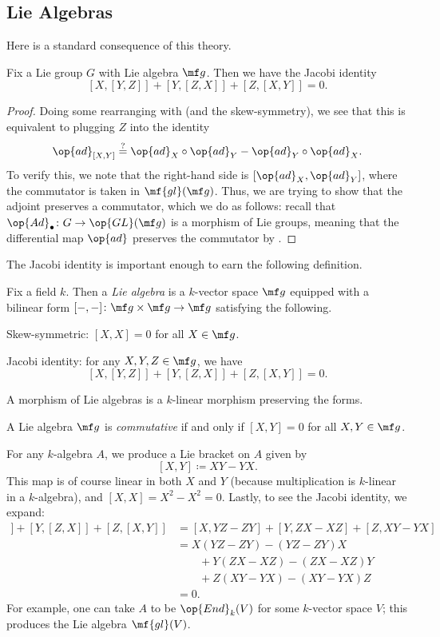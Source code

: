 \documentclass[../notes.tex]{subfiles}
\begin{document}
\subsection{Lie Algebras}
Here is a standard consequence of this theory.
\begin{proposition}
	Fix a Lie group $G$ with Lie algebra $\mf g$. Then we have the Jacobi identity
	\[[X,[Y,Z]]+[Y,[Z,X]]+[Z,[X,Y]]=0.\]
\end{proposition}
\begin{proof}
	Doing some rearranging with  (and the skew-symmetry), we see that this is equivalent to plugging $Z$ into the identity
	\[{\op{ad}_{[X,Y]}}\stackrel?={\op{ad}_X}\circ{\op{ad}_Y}-{\op{ad}_Y}\circ{\op{ad}_X}.\]
	To verify this, we note that the right-hand side is $[{\op{ad}_X},{\op{ad}_Y}]$, where the commutator is taken in $\mf{gl}(\mf g)$. Thus, we are trying to show that the adjoint preserves a commutator, which we do as follows: recall that $\op{Ad}_\bullet\colon G\to\op{GL}(\mf g)$ is a morphism of Lie groups, meaning that the differential map $\op{ad}$ preserves the commutator by .
\end{proof}
The Jacobi identity is important enough to earn the following definition.
\begin{definition}
	Fix a field $k$. Then a \textit{Lie algebra} is a $k$-vector space $\mf g$ equipped with a bilinear form $[-,-]\colon\mf g\times\mf g\to\mf g$ satisfying the following.
	\begin{listalph}
		\item Skew-symmetric: $[X,X]=0$ for all $X\in\mf g$.
		\item Jacobi identity: for any $X,Y,Z\in\mf g$, we have
		\[[X,[Y,Z]]+[Y,[Z,X]]+[Z,[X,Y]]=0.\]
	\end{listalph}
	A morphism of Lie algebras is a $k$-linear morphism preserving the forms.
\end{definition}
\begin{definition}[commutative]
	A Lie algebra $\mf g$ is \textit{commutative} if and only if $[X,Y]=0$ for all $X,Y\in\mf g$.
\end{definition}
\begin{example}
	For any $k$-algebra $A$, we produce a Lie bracket on $A$ given by
	\[[X,Y]\coloneqq XY-YX.\]
	This map is of course linear in both $X$ and $Y$ (because multiplication is $k$-linear in a $k$-algebra), and $[X,X]=X^2-X^2=0$. Lastly, to see the Jacobi identity, we expand:
	\begin{align*}
		[X,[Y,Z]]+[Y,[Z,X]]+[Z,[X,Y]] &= [X,YZ-ZY]+[Y,ZX-XZ]+[Z,XY-YX] \\
		&= X(YZ-ZY)-(YZ-ZY)X \\
		&\qquad+Y(ZX-XZ)-(ZX-XZ)Y \\
		&\qquad+Z(XY-YX)-(XY-YX)Z \\
		&= 0.
	\end{align*}
	For example, one can take $A$ to be $\op{End}_k(V)$ for some $k$-vector space $V$; this produces the Lie algebra $\mf{gl}(V)$.
\end{example}
\end{document}
